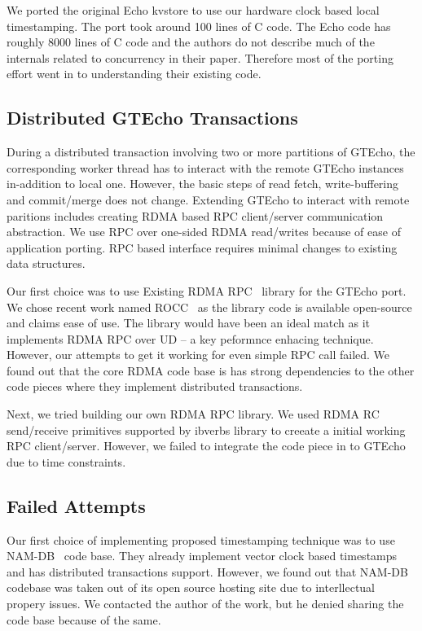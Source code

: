 We ported the original Echo kvstore to use our hardware clock based local timestamping. 
The port took around 100 lines of C code. The Echo code has roughly 8000 lines of C code and 
the authors do not describe much of the internals related to
concurrency in their paper. Therefore most of the porting effort went 
in to understanding their existing code.

\subsection{Distributed GTEcho Transactions}

During a distributed transaction involving two or more partitions of GTEcho, the corresponding worker thread has to 
interact with the remote GTEcho instances in-addition to local one. However, the basic steps of read fetch, write-buffering
and commit/merge does not change. Extending GTEcho to interact with remote paritions includes creating RDMA based RPC 
client/server communication abstraction. We use RPC over one-sided RDMA read/writes because of ease of application porting.
RPC based interface requires minimal changes to existing data structures.

Our first choice was to use Existing RDMA RPC~\cite{drtmh} library for the GTEcho port. We chose recent work named ROCC~\cite{rocc} 
as the library code is available open-source and claims ease of use. The library would have been an ideal match as it
implements RDMA RPC over UD -- a key peformnce enhacing technique. However, our attempts to get it working for even
simple RPC call failed. We found out that the core RDMA code base is has strong dependencies to the other code pieces
where they implement distributed transactions. 

Next, we tried building our own RDMA RPC library. We used RDMA RC send/receive primitives supported by ibverbs 
library to creeate a initial working RPC client/server. However, we failed to integrate the code piece in to GTEcho
due to time constraints.

\subsection{Failed Attempts}

Our first choice of implementing proposed timestamping technique was to use NAM-DB~\cite{namdb} code base. They already
implement vector clock based timestamps and has distributed transactions support. However, we found out
that NAM-DB codebase was taken out of its open source hosting site due to interllectual propery issues.
We contacted the author of the work, but he denied sharing the code base because of the same.

